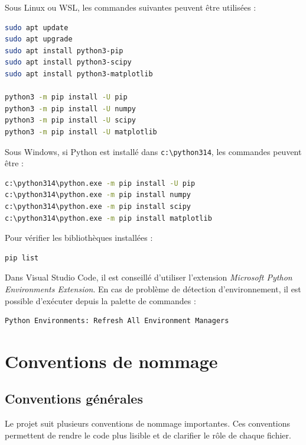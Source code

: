 \documentclass{article}
\begin{document}
Sous Linux ou WSL, les commandes suivantes peuvent être utilisées :

\begin{lstlisting}[language=bash, caption=Installation des bibliothèques sous Linux/WSL]
sudo apt update
sudo apt upgrade
sudo apt install python3-pip
sudo apt install python3-scipy
sudo apt install python3-matplotlib

python3 -m pip install -U pip
python3 -m pip install -U numpy
python3 -m pip install -U scipy
python3 -m pip install -U matplotlib
\end{lstlisting}

Sous Windows, si Python est installé dans \texttt{c:\textbackslash python314}, les commandes peuvent être :

\begin{lstlisting}[language=bash, caption=Installation des bibliothèques sous Windows]
c:\python314\python.exe -m pip install -U pip
c:\python314\python.exe -m pip install numpy
c:\python314\python.exe -m pip install scipy
c:\python314\python.exe -m pip install matplotlib
\end{lstlisting}

Pour vérifier les bibliothèques installées :

\begin{lstlisting}[language=bash, caption=Vérification des bibliothèques]
pip list
\end{lstlisting}

Dans Visual Studio Code, il est conseillé d’utiliser l’extension \textit{Microsoft Python Environments Extension}. En cas de problème de détection d’environnement, il est possible d’exécuter depuis la palette de commandes :

\begin{verbatim}
Python Environments: Refresh All Environment Managers
\end{verbatim}

\section{Conventions de nommage}

\subsection{Conventions générales}

Le projet suit plusieurs conventions de nommage importantes. Ces conventions permettent de rendre le code plus lisible et de clarifier le rôle de chaque fichier.
\end{document}
